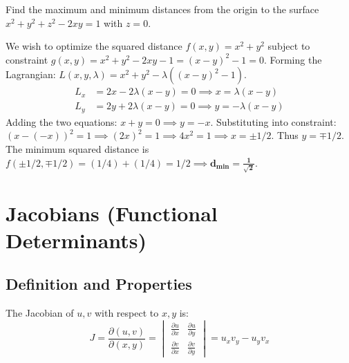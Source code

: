\begin{example}
Find the maximum and minimum distances from the origin to the surface $x^2 + y^2 + z^2 - 2xy = 1$ with $z = 0$.
\end{example}

\begin{solutionbox}
We wish to optimize the squared distance $f(x,y) = x^2 + y^2$ subject to constraint $g(x,y) = x^2 + y^2 - 2xy - 1 = (x-y)^2 - 1 = 0$.
Forming the Lagrangian: $L(x,y,\lambda) = x^2 + y^2 - \lambda((x-y)^2 - 1)$.
\begin{align*}
    L_x &= 2x - 2\lambda(x-y) = 0 \implies x = \lambda(x-y) \\
    L_y &= 2y + 2\lambda(x-y) = 0 \implies y = -\lambda(x-y)
\end{align*}
Adding the two equations: $x + y = 0 \implies y = -x$.
Substituting into constraint: $(x - (-x))^2 = 1 \implies (2x)^2 = 1 \implies 4x^2 = 1 \implies x = \pm 1/2$.
Thus $y = \mp 1/2$.
The minimum squared distance is $f(\pm 1/2, \mp 1/2) = (1/4) + (1/4) = 1/2 \implies \mathbf{d_{\min} = \frac{1}{\sqrt{2}}}$.
\end{solutionbox}

\section{Jacobians (Functional Determinants)}

\subsection{Definition and Properties}

\begin{definition}
The Jacobian of $u, v$ with respect to $x, y$ is:
\begin{equation}
    J = \frac{\partial(u,v)}{\partial(x,y)} = \begin{vmatrix} \frac{\partial u}{\partial x} & \frac{\partial u}{\partial y} \\[0.4em] \frac{\partial v}{\partial x} & \frac{\partial v}{\partial y} \end{vmatrix} = u_x v_y - u_y v_x
\end{equation}
\end{definition}

